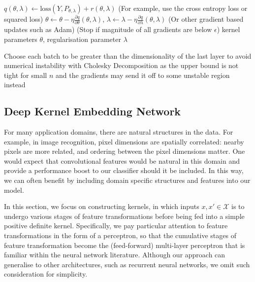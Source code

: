 \documentclass{article}
\newcommand{\note}[1]{{\color{orange} #1}}
\begin{document}
\begin{algorithm}[tb]
\begin{algorithmic}[1]
				\STATE $q(\theta, \lambda) \leftarrow \mathrm{loss}(Y, P_{\theta, \lambda}) + r(\theta, \lambda)$ \hspace{\fill} (For example, use the cross entropy loss or squared loss)
				\STATE $\theta \leftarrow \theta - \eta \frac{\partial q}{\partial \theta}(\theta, \lambda)$, $\lambda \leftarrow \lambda - \eta \frac{\partial q}{\partial \lambda}(\theta, \lambda)$ \hspace{\fill} (Or other gradient based updates such as Adam)
				 \hspace{\fill} (Stop if magnitude of all gradients are below $\epsilon$)
				 kernel parameters $\theta$, regularisation parameter $\lambda$
			\end{algorithmic}
		\end{algorithm}
		
		\note{Choose each batch to be greater than the dimensionality of the last layer to avoid numerical instability with Cholesky Decomposition as the upper bound is not tight for small $n$ and the gradients may send it off to some unstable region instead}


	\subsection{Deep Kernel Embedding Network}
	\label{app:deep_kernel_embeddings}
	
		For many application domains, there are natural structures in the data. For example, in image recognition, pixel dimensions are spatially correlated: nearby pixels are more related, and ordering between the pixel dimensions matter. One would expect that convolutional features \citep{lecun1998gradient} would be natural in this domain and provide a performance boost to our classifier should it be included. In this way, we can often benefit by including domain specific structures and features into our model.
	
	


		In this section, we focus on constructing kernels, in which inputs $x, x' \in \mathcal{X}$ is to undergo various stages of feature transformations before being fed into a simple positive definite kernel. Specifically, we pay particular attention to feature transformations in the form of a perceptron, so that the cumulative stages of feature transformation become the (feed-forward) multi-layer perceptron that is familiar within the neural network literature. Although our approach can generalise to other architectures, such as recurrent neural networks, we omit such consideration for simplicity.
	
\end{document}
